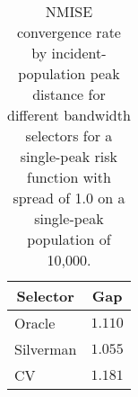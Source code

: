 \begin{table}[htbp]
\begin{center}
\begin{tabular}{lr}
\toprule
\multicolumn{1}{c}{Selector}&\multicolumn{1}{c}{Gap}\tabularnewline
\midrule
Oracle&$1.110$\tabularnewline
Silverman&$1.055$\tabularnewline
CV&$1.181$\tabularnewline
\bottomrule
\end{tabular}
\caption[NMISE Convergence rate by incident-population peak distance]{NMISE convergence rate by incident-population peak distance for different bandwidth selectors for a single-peak risk function with spread of 1.0 on a single-peak population of 10,000.\label{tab:results:nmise_convergence_by_pop_incident_gap}}\end{center}
\end{table}
